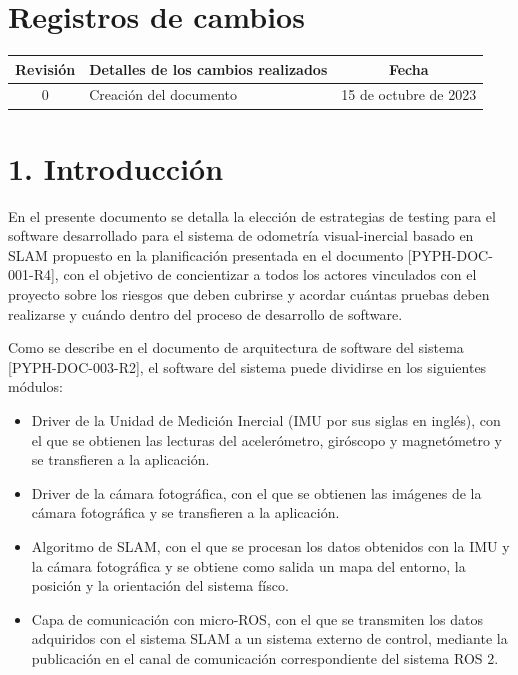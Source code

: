 \documentclass[
11pt, %
codirector, %
]{simple_charter}
\begin{document}
\maketitle
\thispagestyle{empty}
\pagebreak

\thispagestyle{empty}
{\setlength{\parskip}{0pt}
\setcounter{tocdepth}{2}
\tableofcontents{}
}
\pagebreak

\section*{Registros de cambios}
\label{sec:registros-de-cambios}

\begin{table}[ht]
\label{tab:registro}
\centering
\begin{tabularx}{\linewidth}{@{}|c|X|c|@{}}
\hline
\rowcolor[HTML]{C0C0C0}
Revisión &
\multicolumn{1}{c|}{\cellcolor[HTML]{C0C0C0}Detalles de los cambios realizados}
& Fecha
\\ \hline
0 & Creación del documento & 15 de octubre de 2023 \\ \hline
\end{tabularx}
\end{table}

\pagebreak

\section{1. Introducción}
\label{sec:1-introduccion}

En el presente documento se detalla la elección de estrategias de testing para el software
desarrollado para el sistema de odometría visual-inercial basado en SLAM propuesto en la planificación presentada en el documento [PYPH-DOC-001-R4], con el objetivo de
concientizar a todos los actores vinculados con el proyecto sobre los riesgos que deben cubrirse y
acordar cuántas pruebas deben realizarse y cuándo dentro del proceso de desarrollo de software.

Como se describe en el documento de arquitectura de software del sistema [PYPH-DOC-003-R2], el
software del sistema puede dividirse en los siguientes módulos:

\begin{itemize}
	\item Driver de la Unidad de Medición Inercial (IMU por sus siglas en  inglés), con el que se
	obtienen las lecturas del acelerómetro, giróscopo y magnetómetro y se transfieren a la aplicación.
	\item Driver de la cámara fotográfica, con el que se obtienen las imágenes de la cámara
	fotográfica y se transfieren a la aplicación.
	\item Algoritmo de SLAM, con el que se procesan los datos obtenidos con la IMU y la
	cámara fotográfica y se obtiene como salida un mapa del entorno, la posición y la orientación del
	sistema físco.
	\item Capa de comunicación con micro-ROS, con el que se transmiten los datos adquiridos con el
	sistema SLAM a un sistema externo de control, mediante la publicación en el canal de comunicación
	correspondiente del sistema ROS 2.
\end{itemize}
\end{document}
